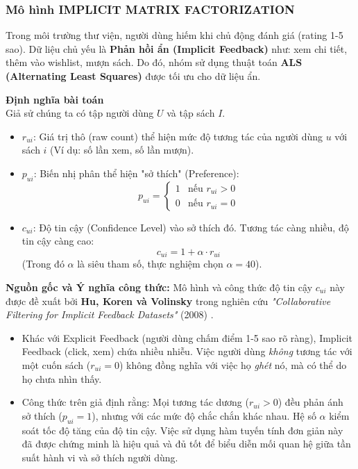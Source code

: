 \subsubsection{Mô hình IMPLICIT MATRIX FACTORIZATION}
Trong môi trường thư viện, người dùng hiếm khi chủ động đánh giá (rating 1-5 sao). Dữ liệu chủ yếu là \textbf{Phản hồi ẩn (Implicit Feedback)} như: xem chi tiết, thêm vào wishlist, mượn sách. Do đó, nhóm sử dụng thuật toán \textbf{ALS (Alternating Least Squares)} được tối ưu cho dữ liệu ẩn.

\textbf{Định nghĩa bài toán} \\
Giả sử chúng ta có tập người dùng $U$ và tập sách $I$.
\begin{itemize}
    \item $r_{ui}$: Giá trị thô (raw count) thể hiện mức độ tương tác của người dùng $u$ với sách $i$ (Ví dụ: số lần xem, số lần mượn).
    \item $p_{ui}$: Biến nhị phân thể hiện "sở thích" (Preference):
    \[
    p_{ui} = \begin{cases} 
    1 & \text{nếu } r_{ui} > 0 \\
    0 & \text{nếu } r_{ui} = 0 
    \end{cases}
    \]
    \item $c_{ui}$: Độ tin cậy (Confidence Level) vào sở thích đó. Tương tác càng nhiều, độ tin cậy càng cao:
    \begin{equation}
        c_{ui} = 1 + \alpha \cdot r_{ui}
    \end{equation}
    (Trong đó $\alpha$ là siêu tham số, thực nghiệm chọn $\alpha = 40$).
\end{itemize}

\textbf{Nguồn gốc và Ý nghĩa công thức:}
Mô hình và công thức độ tin cậy $c_{ui}$ này được đề xuất bởi \textbf{Hu, Koren và Volinsky} trong nghiên cứu \textit{"Collaborative Filtering for Implicit Feedback Datasets"} (2008) \cite{Hu2008ImplicitCF}. 
\begin{itemize}
    \item Khác với Explicit Feedback (người dùng chấm điểm 1-5 sao rõ ràng), Implicit Feedback (click, xem) chứa nhiều nhiễu. Việc người dùng \textit{không} tương tác với một cuốn sách ($r_{ui}=0$) không đồng nghĩa với việc họ \textit{ghét} nó, mà có thể do họ chưa nhìn thấy.
    \item Công thức trên giả định rằng: Mọi tương tác dương ($r_{ui} > 0$) đều phản ánh sở thích ($p_{ui}=1$), nhưng với các mức độ chắc chắn khác nhau. Hệ số $\alpha$ kiểm soát tốc độ tăng của độ tin cậy. Việc sử dụng hàm tuyến tính đơn giản này đã được chứng minh là hiệu quả và đủ tốt để biểu diễn mối quan hệ giữa tần suất hành vi và sở thích người dùng.
\end{itemize}

